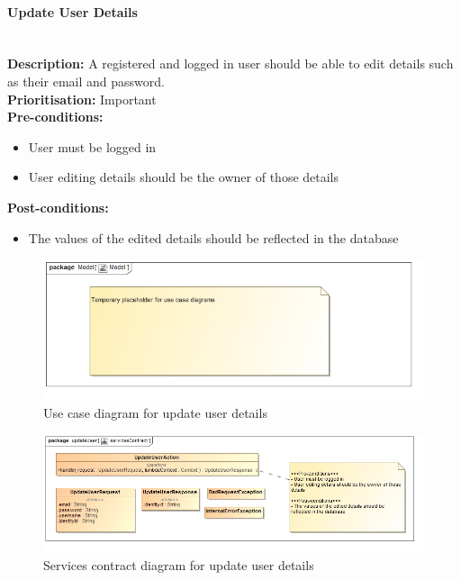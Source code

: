\documentclass{article}
\begin{document}
	\paragraph{Update User Details}\mbox{}\\
		\textbf{Description:} A registered and logged in user should be able to edit details such as their email and password.\\
		\textbf{Prioritisation:} Important\\		
		\textbf{Pre-conditions:}
			\begin{itemize}
				\item User must be logged in
				\item User editing details should be the owner of those details
			\end{itemize}
		\textbf{Post-conditions:}
			\begin{itemize}
				\item The values of the edited details should be reflected in the database
			\end{itemize}

		\begin{figure}[H]
			\includegraphics[width=\linewidth]{images/tempUseCase.jpg}
			\caption{Use case diagram for update user details}
		\end{figure}		
		
		\begin{figure}[H]
			\includegraphics[width=\linewidth]{images/ServicesContracts/updateUser.jpg}
			\caption{Services contract diagram for update user details}
		\end{figure}
	
\end{document}
